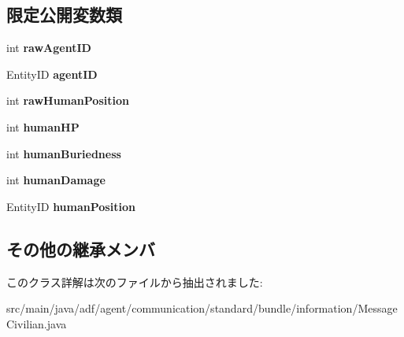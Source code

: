 \subsection*{限定公開変数類}
\begin{DoxyCompactItemize}
\item 
\hypertarget{classadf_1_1agent_1_1communication_1_1standard_1_1bundle_1_1information_1_1MessageCivilian_a346852fbbd82851c3ad8ad4a6fa40b7a}{}\label{classadf_1_1agent_1_1communication_1_1standard_1_1bundle_1_1information_1_1MessageCivilian_a346852fbbd82851c3ad8ad4a6fa40b7a} 
int {\bfseries raw\+Agent\+ID}
\item 
\hypertarget{classadf_1_1agent_1_1communication_1_1standard_1_1bundle_1_1information_1_1MessageCivilian_a112a3de877ec62d78865425892a32a2a}{}\label{classadf_1_1agent_1_1communication_1_1standard_1_1bundle_1_1information_1_1MessageCivilian_a112a3de877ec62d78865425892a32a2a} 
Entity\+ID {\bfseries agent\+ID}
\item 
\hypertarget{classadf_1_1agent_1_1communication_1_1standard_1_1bundle_1_1information_1_1MessageCivilian_a050585611974a971ea3cbba84c03d60a}{}\label{classadf_1_1agent_1_1communication_1_1standard_1_1bundle_1_1information_1_1MessageCivilian_a050585611974a971ea3cbba84c03d60a} 
int {\bfseries raw\+Human\+Position}
\item 
\hypertarget{classadf_1_1agent_1_1communication_1_1standard_1_1bundle_1_1information_1_1MessageCivilian_a3cdab5d92aca4113de628890aa8c2909}{}\label{classadf_1_1agent_1_1communication_1_1standard_1_1bundle_1_1information_1_1MessageCivilian_a3cdab5d92aca4113de628890aa8c2909} 
int {\bfseries human\+HP}
\item 
\hypertarget{classadf_1_1agent_1_1communication_1_1standard_1_1bundle_1_1information_1_1MessageCivilian_a0f525a39e26c9a99fefb38512138596d}{}\label{classadf_1_1agent_1_1communication_1_1standard_1_1bundle_1_1information_1_1MessageCivilian_a0f525a39e26c9a99fefb38512138596d} 
int {\bfseries human\+Buriedness}
\item 
\hypertarget{classadf_1_1agent_1_1communication_1_1standard_1_1bundle_1_1information_1_1MessageCivilian_a4a209c83342c40b71fa7d7b1b8cba83a}{}\label{classadf_1_1agent_1_1communication_1_1standard_1_1bundle_1_1information_1_1MessageCivilian_a4a209c83342c40b71fa7d7b1b8cba83a} 
int {\bfseries human\+Damage}
\item 
\hypertarget{classadf_1_1agent_1_1communication_1_1standard_1_1bundle_1_1information_1_1MessageCivilian_ab3f07655291ceb9f384af7227a3c7a8a}{}\label{classadf_1_1agent_1_1communication_1_1standard_1_1bundle_1_1information_1_1MessageCivilian_ab3f07655291ceb9f384af7227a3c7a8a} 
Entity\+ID {\bfseries human\+Position}
\end{DoxyCompactItemize}
\subsection*{その他の継承メンバ}


このクラス詳解は次のファイルから抽出されました\+:\begin{DoxyCompactItemize}
\item 
src/main/java/adf/agent/communication/standard/bundle/information/Message\+Civilian.\+java\end{DoxyCompactItemize}

